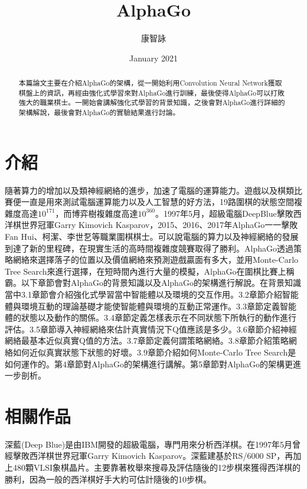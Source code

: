 \documentclass[a4paper,12pt]{article}
\title{AlphaGo}
\author{康智詠}
\date{January 2021}
\begin{document}
\maketitle
\begin{abstract}
\quad 本篇論文主要在介紹AlphaGo的架構，從一開始利用Convolution Neural Network獲取棋盤上的資訊，再經由強化式學習來對AlphaGo進行訓練，最後使得AlphaGo可以打敗強大的職業棋士。一開始會講解強化式學習的背景知識，之後會對AlphaGo進行詳細的架構解說，最後會對AlphaGo的實驗結果進行討論。
\end{abstract}
\section{介紹}
\qquad 隨著算力的增加以及類神經網絡的進步，加速了電腦的運算能力。遊戲以及棋類比賽便一直是用來測試電腦運算能力以及人工智慧的好方法，19路圍棋的狀態空間複雜度高達$10^{171}$，而博弈樹複雜度高達$10^{360}$。1997年5月，超級電腦DeepBlue擊敗西洋棋世界冠軍Garry Kimovich Kasparov，2015、2016、2017年AlphaGo一一擊敗Fan Hui、柯潔、李世乭等職業圍棋棋士。可以說電腦的算力以及神經網絡的發展到達了新的里程碑，在現實生活的高時間複雜度競賽取得了勝利。AlphaGo透過策略網絡來選擇落子的位置以及價值網絡來預測遊戲贏面有多大，並用Monte-Carlo Tree Search來進行選擇，在短時間內進行大量的模擬，AlphaGo在圍棋比賽上稱霸。以下章節會對AlphaGo的背景知識以及AlphaGo的架構進行解說。在背景知識當中3.1章節會介紹強化式學習當中智能體以及環境的交互作用。3.2章節介紹智能體與環境互動的理論基礎才能使智能體與環境的互動正常運作。3.3章節定義智能體的狀態以及動作的關係。3.4章節定義怎樣表示在不同狀態下所執行的動作進行評估。3.5章節導入神經網絡來估計真實情況下Q值應該是多少。3.6章節介紹神經網絡最基本近似真實Q值的方法。3.7章節定義何謂策略網絡。3.8章節介紹策略網絡如何近似真實狀態下狀態的好壞。3.9章節介紹如何Monte-Carlo Tree Search是如何運作的。第4章節對AlphaGo的架構進行講解。第5章節對AlphaGo的架構更進一步剖析。
\section{相關作品}
\qquad 深藍(Deep Blue)是由IBM開發的超級電腦，專門用來分析西洋棋。在1997年5月曾經擊敗西洋棋世界冠軍Garry Kimovich Kasparov。深藍建基於RS/6000 SP，再加上480顆VLSI象棋晶片。主要靠著枚舉來搜尋及評估隨後的12步棋來獲得西洋棋的勝利，因為一般的西洋棋好手大約可估計隨後的10步棋。
\end{document}
